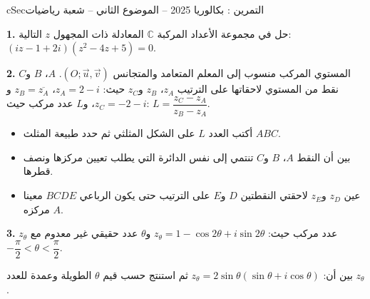 \documentclass[12pt,a4paper]{article}
\newenvironment{BOX}[2]{\begin{otherlanguage}{english}\begin{arbox}{#1}{#2}}{\end{arbox}\end{otherlanguage}}
\newcounter{exo}
\newenvironment{tamrin}[1]{\stepcounter{exo}\begin{BOX}{cSec}{التمرين \theexo: #1}}{\end{BOX}}
\newenvironment{sq}{\begin{itemize}[leftmargin=2.4em,itemsep=3pt]}{\end{itemize}}
\newcommand{\qa}{\item[(أ)]}\newcommand{\qb}{\item[(ب)]}\newcommand{\qc}{\item[(جـ)]}\newcommand{\qd}{\item[(د)]}\newcommand{\qe}{\item[(هـ)]}
\newcommand{\QQ}[1]{\par\smallskip\textbf{#1.} }
\begin{document}
\begin{tamrin}{بكالوريا 2025 -- الموضوع الثاني -- شعبة رياضيات}
\QQ{1} حل في مجموعة الأعداد المركبة $\mathbb{C}$ المعادلة ذات المجهول $z$ التالية: $\left(iz-1+2i\right)\left(z^2-4z+5\right)=0$.

\QQ{2} المستوي المركب منسوب إلى المعلم المتعامد والمتجانس $\left(O;\vec u,\vec v\right)$.
$A$، $B$ و$C$ نقط من المستوي لاحقاتها على الترتيب $z_A$، $z_B$ و$z_C$ حيث: $z_A=2-i$، $z_B=\overline{z_A}$ و$z_C=-2-i$،
و$L$ عدد مركب حيث: $L=\dfrac{z_C-z_A}{z_B-z_A}$.
\begin{sq}
\qa أكتب العدد $L$ على الشكل المثلثي ثم حدد طبيعة المثلث $ABC$.
\qb بين أن النقط $A$، $B$ و$C$ تنتمي إلى نفس الدائرة التي يطلب تعيين مركزها ونصف قطرها.
\qc عين $z_D$ و$z_E$ لاحقتي النقطتين $D$ و$E$ على الترتيب حتى يكون الرباعي $BCDE$ معينا مركزه $A$.
\end{sq}
\QQ{3} $z_\theta$ عدد مركب حيث: $z_\theta=1-\cos2\theta+i\sin2\theta$ و$\theta$ عدد حقيقي غير معدوم مع $-\dfrac{\pi}{2}<\theta<\dfrac{\pi}{2}$.

بين أن: $z_\theta=2\sin\theta\left(\sin\theta+i\cos\theta\right)$ ثم استنتج حسب قيم $\theta$ الطويلة وعمدة للعدد $z_\theta$.
\end{tamrin}
\end{document}
